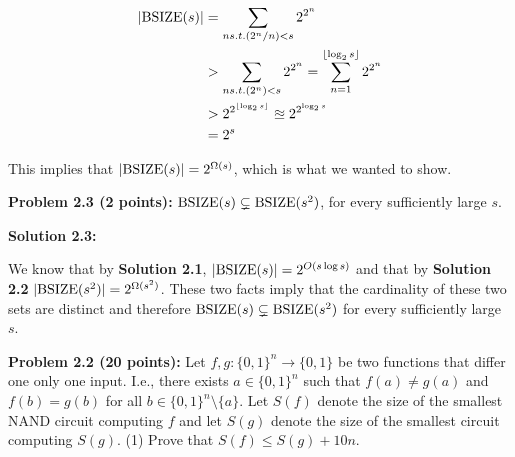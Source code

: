 \documentclass[11pt]{article}
\begin{document}
\begin{equation} \label{eq1}
\begin{split}
	|\mathrm{BSIZE}(s)| & = \sum_{n s.t. (2^n/n) < s}{2^{2^n}} \\
	& > \sum_{n s.t. (2^n) < s}{2^{2^n}} = \sum_{n=1}^{\lfloor \log_2{s} \rfloor}{2^{2^n}} \\ 
	& > 2^{2^{\lfloor \log_2{s} \rfloor}} \approxeq 2^{2^{\log_2{s}}} \\
	& = 2^{s}\\
\end{split}
\end{equation}

This implies that $|\mathrm{BSIZE}(s)| = 2^{\Omega(s)}$, which is what we wanted to show.

\textbf{Problem 2.3 (2 points):} $\mathrm{BSIZE}(s) \subsetneq \mathrm{BSIZE}(s^2)$, for every sufficiently large $s$.  

\textbf{Solution 2.3:}%

We know that by \textbf{Solution 2.1}, $|\mathrm{BSIZE}(s)| =  2^{O(s \log s)}$ and that by \textbf{Solution 2.2}
$|\mathrm{BSIZE}(s^2)| = 2^{\Omega(s^2)}$. These two facts imply that the cardinality of these two sets are distinct and therefore $\mathrm{BSIZE}(s) \subsetneq \mathrm{BSIZE}(s^2)$ for every sufficiently large $s$.

\iffalse %
\textbf{Problem 2.2 (20 points):}
Let $f,g:\{0,1\}^n \to \{0,1\}$ be two functions that differ one only one input. I.e., there exists $a \in \{0,1\}^n$ such that $f(a) \ne g(a)$ and $f(b) = g(b)$ for all $b \in \{0,1\}^n \setminus \{a\}$. Let $S(f)$ denote the size of the smallest NAND circuit computing $f$ and let $S(g)$ denote the size of the smallest circuit computing $S(g)$. (1) Prove that $S(f) \leq S(g) + 10 n$. 
\end{document}
